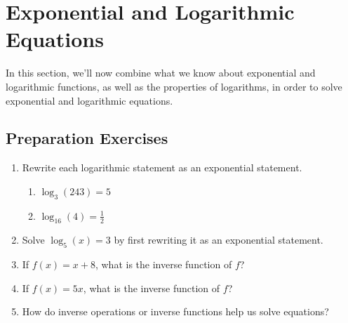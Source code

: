 
\section{Exponential and Logarithmic Equations} \label{exponential-and-logarithmic-equations}

In this section, we'll now combine what we know about exponential and logarithmic functions, as well as the properties of logarithms, in order to solve exponential and logarithmic equations.      \\[0.5em]


\subsection*{Preparation Exercises} \label{prep-exponential-and-logarithmic-equations}

\begin{myPrep}
	\begin{enumerate}
		\item Rewrite each logarithmic statement as an exponential statement.
			\begin{multicols}{2}
			\begin{enumerate}
				\item $\log_3(243) = 5$
				\item $\log_{16}(4) = \frac{1}{2}$
			\end{enumerate}
			\end{multicols}
			\vfill
		\item Solve $\log_5(x)=3$ by first rewriting it as an exponential statement.
		\vfill
		\item If $f(x) = x+8$, what is the inverse function of $f$?
		\vfill
		\item If $f(x) = 5x$, what is the inverse function of $f$?
		\vfill
		\item How do inverse operations or inverse functions help us solve equations?
		\vfill
	\end{enumerate}
\end{myPrep}

